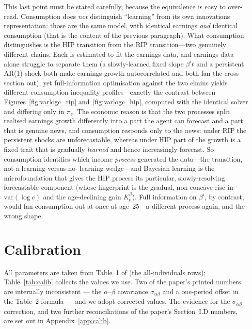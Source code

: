 \documentclass[11pt,fleqn]{article}
\begin{document}
This last point must be stated carefully, because the equivalence is easy to over-read.
Consumption does \emph{not} distinguish ``learning'' from its own innovations
representation: those are the same model, with identical earnings \emph{and} identical
consumption (that is the content of the previous paragraph). What consumption distinguishes
is the HIP transition from the RIP transition---two genuinely different chains. Each is
estimated to fit the earnings data, and earnings data alone struggle to separate them (a
slowly-learned fixed slope $\beta^i t$ and a persistent AR(1) shock both make earnings
growth autocorrelated and both fan the cross-section out); yet full-information optimisation
against the two chains yields different consumption-inequality profiles---exactly the
contrast between Figures~\ref{fig:varlogc_rip} and~\ref{fig:varlogc_hip}, computed with the
identical solver and differing only in $\pi_z$. The economic reason is that the two
processes split realised earnings growth differently into a part the agent can forecast and
a part that is genuine news, and consumption responds only to the news: under RIP the
persistent shocks are unforecastable, whereas under HIP part of the growth is a fixed trait
that is gradually \emph{learned} and hence increasingly forecast. So consumption identifies
which income \emph{process} generated the data---the transition, not a learning-versus-no-%
learning wedge---and Bayesian learning is the microfoundation that gives the HIP process its
particular, slowly-resolving forecastable component (whose fingerprint is the gradual,
non-concave rise in $\mathrm{var}(\log c)$ and the age-declining gain $K^\beta_t$). Full
information on $\beta^i$, by contrast, would fan consumption out at once at age~25---a
different process again, and the wrong shape.

\section{Calibration}

All parameters are taken from Table~1 of \cite{Guvenen2007} (the all-individuals rows);
Table~\ref{tab:calib} collects the values we use. Two of the paper's printed numbers are
internally inconsistent --- the $\alpha$--$\beta$ covariance $\sigma_{\alpha\beta}$ and a
one-period offset in the Table~2 formula --- and we adopt corrected values. The evidence
for the $\sigma_{\alpha\beta}$ correction, and two further reconciliations of the paper's
Section~I.D numbers, are set out in Appendix~\ref{app:calib}.
\end{document}
